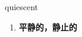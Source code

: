 
\begin{frame}
{\huge quiescent}
\begin{center}
\begin{enumerate}\Large
  \item \textbf{平静的，静止的}
\end{enumerate}
\end{center}
\end{frame}
